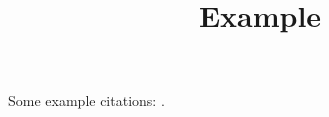 \documentclass{article}
\title{Example}
\author{}
\date{}
\begin{document}
\maketitle

Some example citations: \cite{chomsky.n:1957, kolmogorov.a:1968, tesniere.l:1959, estes.w:1959}.

\printbibliography
\end{document}
